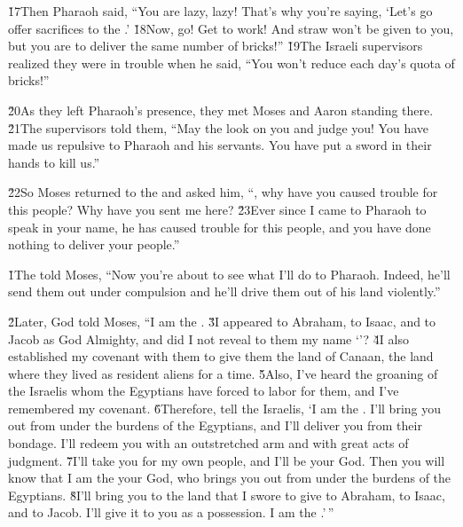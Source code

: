 \v{17}Then Pharaoh said, ``You are lazy, lazy! That's why you're saying, `Let's go offer sacrifices to the .' \v{18}Now, go! Get to work! And straw won't be given to you, but you are to deliver the same number of bricks!'' \v{19}The Israeli supervisors realized they were in trouble when he said, ``You won't reduce each day's quota of bricks!''

\v{20}As they left Pharaoh's presence, they met Moses and Aaron standing there. \v{21}The supervisors told them, ``May the  look on you and judge you! You have made us repulsive to Pharaoh and his servants. You have put a sword in their hands to kill us.''

\v{22}So Moses returned to the  and asked him, ``, why have you caused trouble for this people? Why have you sent me here? \v{23}Ever since I came to Pharaoh to speak in your name, he has caused trouble for this people, and you have done nothing to deliver your people.''

\v{1}The  told Moses, ``Now you're about to see what I'll do to Pharaoh. Indeed, he'll send them out under compulsion and he'll drive them out of his land violently.''

\v{2}Later, God told Moses, ``I am the . \v{3}I appeared to Abraham, to Isaac, and to Jacob as God Almighty, and did I not reveal to them my name `'? \v{4}I also established my covenant with them to give them the land of Canaan, the land where they lived as resident aliens for a time. \v{5}Also, I've heard the groaning of the Israelis whom the Egyptians have forced to labor for them, and I've remembered my covenant. \v{6}Therefore, tell the Israelis, `I am the . I'll bring you out from under the burdens of the Egyptians, and I'll deliver you from their bondage. I'll redeem you with an outstretched arm and with great acts of judgment. \v{7}I'll take you for my own people, and I'll be your God. Then you will know that I am the  your God, who brings you out from under the burdens of the Egyptians. \v{8}I'll bring you to the land that I swore to give to Abraham, to Isaac, and to Jacob. I'll give it to you as a possession. I am the .'\,''

